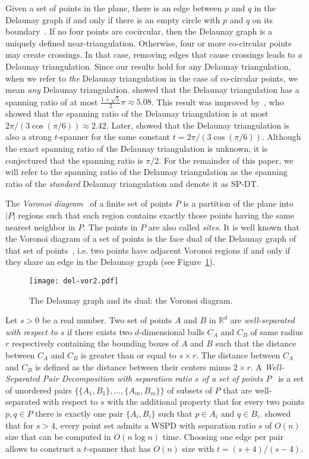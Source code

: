 \documentclass[pdftex,leqno,fleqn,12pt]{article}
\newcommand{\sdsr}{{\rm{SP-DT}}}
\begin{document}
Given a set of points in the plane, there is an edge between $p$ and $q$ in the
Delaunay graph if and only if there is an empty circle with $p$ and $q$ on its
boundary~\cite{keil92}.  If no four points are cocircular, then the Delaunay
graph is a uniquely defined near-triangulation. Otherwise, four or more
co-circular points may create crossings. In that case, removing edges that
cause crossings leads to \emph{a} Delaunay triangulation. Since our results
hold for any Delaunay triangulation, when we refer to \emph{the} Delaunay
triangulation in the case of co-circular points, we mean \emph{any} Delaunay
triangulation. \citet{dobkin90} showed that the Delaunay triangulation has a
spanning ratio of at most $\frac{1+\sqrt{5}}{2}\pi\approx 5.08$. This result
was improved by~\citet{keil92}, who showed that the spanning ratio of the
Delaunay triangulation is at most $2\pi/(3\cos(\pi/6))\approx 2.42$.  Later,
\citet{bose04} showed that the Delaunay triangulation is also a strong
$t$-spanner for the same constant $t=2\pi/(3\cos(\pi/6))$.  Although the exact
spanning ratio of the Delaunay triangulation is unknown, it is conjectured that
the spanning ratio is $\pi/2$. For the remainder of this paper, we will refer
to the spanning ratio of the Delaunay triangulation as the spanning ratio of
the {\em standard} Delaunay triangulation and denote it as \sdsr.

The \emph{Voronoi diagram}~\cite{deberg97} of a finite set of points $P$ is
a partition of the plane into $|P|$ regions such that each region contains
exactly those points having the same nearest neighbor in $P$. The points in
$P$ are also called \emph{sites}.  It is well known that the Voronoi diagram
of a set of points is the face dual of the Delaunay graph of that set of
points~\cite{deberg97}, i.e. two points have adjacent Voronoi regions if and
only if they share an edge in the Delaunay graph (see
Figure~\ref{fig-vor-del}).

\begin{figure}
\centering
\texttt{[image: del-vor2.pdf]}
\caption{The Delaunay graph and its dual: the Voronoi diagram.}\label{fig-vor-del}
\end{figure}

Let $s>0$ be a real number. Two set of points $A$ and $B$ in $\mathbb{R}^d$ are
\emph{well-separated with respect to $s$} if there exists two $d$-dimensional
balls $C_A$ and $C_B$ of same radius $r$ respectively containing the bounding
boxes of $A$ and $B$ such that the distance between $C_A$ and $C_B$ is greater
than or equal to $s\times r$. The distance between $C_A$ and $C_B$ is defined
as the distance between their centers minus $2\times r$. A \emph{Well-Separated
Pair Decomposition with separation ratio $s$ of a set of points
$P$}~\cite{callahan95,smid07} is a set of unordered pairs
$\{\{A_1,B_1\},\ldots,\{A_m,B_m\}\}$ of subsets of $P$ that are well-separated
with respect to $s$ with the additional property that for every two points
$p,q\in P$ there is exactly one pair $\{A_i,B_i\}$ such that $p\in A_i$ and
$q\in B_i$. \citet{callahan95} showed that for $s>4$, every point set admits a
WSPD with separation ratio $s$ of $O(n)$ size that can be computed in $O(n\log
n)$ time. Choosing one edge per pair allows to construct a $t$-spanner that has
$O(n)$ size with $t=(s+4)/(s-4)$.
\end{document}
